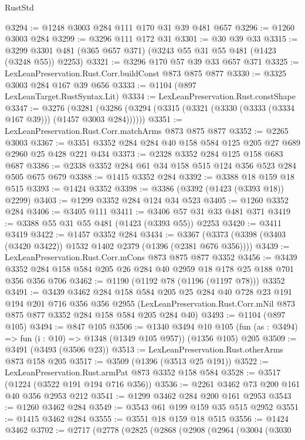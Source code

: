 \begin{lexlean}{RustStd}
\begin{coremodule}
{\begin{coremodule}
{{{{{{{{{@3294 := @1248 @3003 @284 @111 @170 @31 @39 @481 @657
@3296 := @1260 @3003 @284
@3299 := @3296 @111 @172 @31
@3301 := @30 @39 @33
@3315 := @3299 @3301 @481 (@365 @657 @371) (@3243 @55 @31 @55 @481 (@1423 (@3248 @55)) @2253)
@3321 := @3296 @170 @57 @39 @33 @657 @371
@3325 := LexLeanPreservation.Rust.Corr.buildConst @873 @875 @877
@3330 := @3325 @3003 @284 @167 @39 @656
@3333 := @1104 (@897 LexLeanTarget.RustSyntax.Lit)
@3334 := LexLeanPreservation.Rust.constShape
@3347 := @3276
    (@3281 (@3286 (@3294 (@3315 (@3321 (@3330 (@3333 (@3334 @167 @39))) (@1457 @3003 @284))))))
@3351 := LexLeanPreservation.Rust.Corr.matchArms @873 @875 @877
@3352 := @2265 @3003
@3367 := @3351 @3352 @284 @284 @40 @158 @584 @125 @205 @27 @689 @2960 @25 @428 @221 @434
@3373 := @2328 @3352 @284 @125 @158 @683 @687
@3386 := @2338 @3352 @284 @61 @34 @158 @515 @124 @356 @523 @284 @505 @675 @679
@3388 := @1415 @3352 @284
@3392 := @3388 @18 @159 @18 @515
@3393 := @1424 @3352
@3398 := @3386 (@3392 (@1423 (@3393 @18)) @2299)
@3403 := @1299 @3352 @284 @124 @34 @523
@3405 := @1260 @3352 @284
@3406 := @3405 @111
@3411 := @3406 @57 @31 @33 @481 @371
@3419 := @3388 @55 @31 @55 @481 (@1423 (@3393 @55)) @2253
@3420 := @3411 @3419
@3422 := @1457 @3352 @284
@3434 := @3367 (@3373 (@3398 (@3403 (@3420 @3422)) @1532 @1402 @2379 (@1396 (@2381 @676 @356))))
@3439 := LexLeanPreservation.Rust.Corr.mCons @873 @875 @877 @3352
@3456 := @3439 @3352 @284 @158 @584 @205 @26 @284 @40 @2959 @18 @178 @25 @188 @701 @356 @356 @706
@3462 := @1190 (@1192 @78 (@1196 (@1197 @78))) @3352
@3491 := @3439
    @3462
    @284
    @158
    @584
    @205
    @25
    @284
    @40
    @728
    @23
    @191
    @194
    @201
    @716
    @356
    @356
    @2955
    (LexLeanPreservation.Rust.Corr.mNil @873 @875 @877 @3352 @284 @158 @584 @205 @284 @40)
@3493 := @1104 (@897 @105)
@3494 := @847 @105
@3506 := @1340
    @3494
    @10
    @105
    (fun (as : @3494) => fun (i : @10) => @1348 (@1349 @105 @957))
    (@1356 @105)
    @205
@3509 := @3491 (@3493 (@3506 @23))
@3513 := LexLeanPreservation.Rust.otherArms @873 @158 @205
@3517 := @3509 (@1396 (@3513 @25 @191))
@3522 := LexLeanPreservation.Rust.armPat @873 @3352 @158 @584
@3528 := @3517 (@1224 (@3522 @191 @194 @716 @356))
@3536 := @2261 @3462 @73 @200 @161 @40 @356 @2953 @212
@3541 := @1299 @3462 @284 @200 @161 @2953
@3543 := @1260 @3462 @284
@3549 := @3543 @61 @199 @159 @35 @515 @2952
@3551 := @1415 @3462 @284
@3555 := @3551 @18 @159 @18 @515
@3556 := @1424 @3462
@3702 := @2717
    (@2778
      (@2825
        (@2868
          (@2908
            (@2964
              (@3004
                (@3030
}}}}}}}}}
\end{coremodule}}
\end{coremodule}
\end{lexlean}
